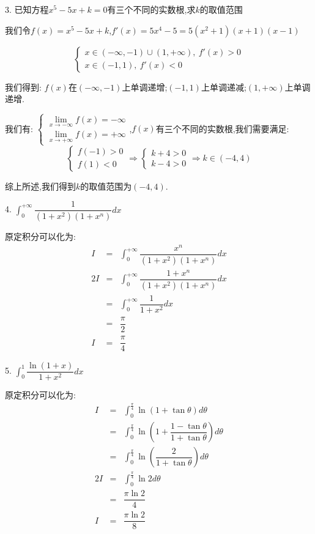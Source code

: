 3. 已知方程$x^5-5x+k=0$有三个不同的实数根,求$k$的取值范围
\begin{solution}

	我们令$f(x)=x^5-5x+k$,$f'(x)=5x^4-5=5(x^2+1)(x+1)(x-1)$
	
	$$\left\lbrace
	\begin{array}{l}
		x\in(-\infty,-1)\cup(1,+\infty),\ f'(x)>0\\
		x\in(-1,1),\ f'(x)<0
	\end{array}
	\right. $$
	
	我们得到:  $f(x)$在$(-\infty,-1)$上单调递增;$(-1,1)$上单调递减;$(1,+\infty)$上单调递增.
	
	我们有:  $\left\lbrace
	\begin{array}{l}
		\lim\limits_{x\rightarrow -\infty}f(x)=-\infty\\
		\lim\limits_{x\rightarrow +\infty}f(x)=+\infty
	\end{array}
	\right. $,$f(x)$有三个不同的实数根,我们需要满足:  
	$$\left\lbrace
	\begin{array}{l}
		f(-1)>0\\
		f(1)<0
	\end{array}
	\right. \Rightarrow \left\lbrace
	\begin{array}{l}
		k+4>0\\
		k-4>0
	\end{array}
	\right. \Rightarrow k\in(-4,4)$$
	
	综上所述,我们得到$k$的取值范围为$(-4,4)$.
\end{solution}

4. $\int_{0}^{+\infty}\dfrac{1}{(1+x^2)(1+x^n)}dx$
\begin{solution}

	原定积分可以化为:  
	\begin{eqnarray*}
		I&=&\int_{0}^{+\infty}\dfrac{x^n}{(1+x^2)(1+x^n)}dx\\
		2I&=&\int_{0}^{+\infty}\dfrac{1+x^n}{(1+x^2)(1+x^n)}dx\\
		&=&\int_{0}^{+\infty}\dfrac{1}{1+x^2}dx\\
		&=&\dfrac{\pi}{2}\\
		I&=&\dfrac{\pi}{4}
	\end{eqnarray*}
\end{solution}

5. $\int_{0}^{1}\dfrac{\ln(1+x)}{1+x^2}dx$
\begin{solution}

	原定积分可以化为:  
	\begin{eqnarray*}
		I&=&\int_{0}^{\frac{\pi}{4}}\ln(1+\tan \theta)d\theta\\
		&=&\int_{0}^{\frac{\pi}{4}}\ln(1+\dfrac{1-\tan\theta}{1+\tan\theta})d\theta\\
		&=&\int_{0}^{\frac{\pi}{4}}\ln(\dfrac{2}{1+\tan\theta})d\theta\\
		2I&=&\int_{0}^{\frac{\pi}{4}}\ln2d\theta\\
		&=&\dfrac{\pi \ln 2}{4}\\
		I&=&\dfrac{\pi \ln 2}{8}
	\end{eqnarray*}
\end{solution}

